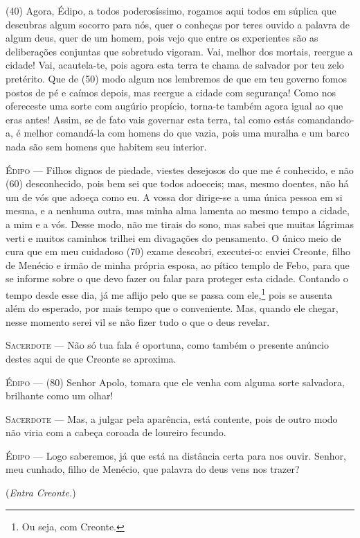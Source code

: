 (40) Agora, Édipo, a todos poderosíssimo, rogamos aqui todos em súplica
que descubras algum socorro para nós, quer o conheças por teres ouvido a
palavra de algum deus, quer de um homem, pois vejo que entre os
experientes são as deliberações conjuntas que sobretudo vigoram. Vai,
melhor dos mortais, reergue a cidade! Vai, acautela-te, pois agora esta
terra te chama de salvador por teu zelo pretérito. Que de (50) modo
algum nos lembremos de que em teu governo fomos postos de pé e caímos
depois, mas reergue a cidade com segurança! Como nos ofereceste uma
sorte com augúrio propício, torna-te também agora igual ao que eras
antes! Assim, se de fato vais governar esta terra, tal como estás
comandando-a, é melhor comandá-la com homens do que vazia, pois uma
muralha e um barco nada são sem homens que habitem seu interior.

\textsc{Édipo} --- Filhos dignos de piedade, viestes desejosos do que me é conhecido, e não
(60) desconhecido, pois bem sei que todos adoeceis; mas, mesmo doentes,
não há um de vós que adoeça como eu. A vossa dor dirige-se a uma única
pessoa em si mesma, e a nenhuma outra, mas minha alma lamenta ao mesmo
tempo a cidade, a mim e a vós. Desse modo, não me tirais do sono, mas
sabei que muitas lágrimas verti e muitos caminhos trilhei em divagações
do pensamento. O único meio de cura que em meu cuidadoso (70) exame
descobri, executei-o: enviei Creonte, filho de Menécio e irmão de minha
própria esposa, ao pítico templo de Febo, para que se informe sobre o
que devo fazer ou falar para proteger esta cidade. Contando o tempo
desde esse dia, já me aflijo pelo que se passa com ele,\footnote{Ou seja,
  com Creonte.} pois se ausenta além do esperado, por mais tempo que o
conveniente. Mas, quando ele chegar, nesse momento serei vil se não
fizer tudo o que o deus revelar.

\textsc{Sacerdote} --- Não só tua fala é oportuna, como também o presente anúncio destes aqui
de que Creonte se aproxima.

\textsc{Édipo} --- (80) Senhor Apolo, tomara que ele venha com alguma sorte salvadora,
brilhante como um olhar!

\textsc{Sacerdote} --- Mas, a julgar pela aparência, está contente, pois de outro modo não
viria com a cabeça coroada de loureiro fecundo.

\textsc{Édipo} --- Logo saberemos, já que está na distância certa para nos ouvir. Senhor,
meu cunhado, filho de Menécio, que palavra do deus vens nos trazer?

(\emph{Entra Creonte.})

